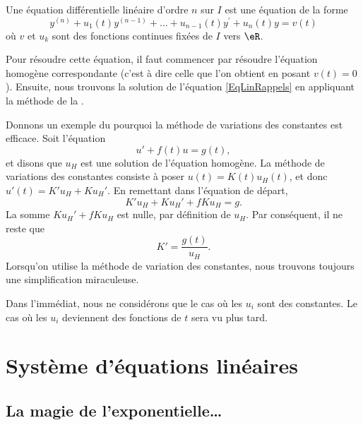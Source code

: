 Une équation différentielle linéaire d'ordre $n$ sur $I$ est une équation de la forme
\begin{equation}	\label{EqLinRappels}
	y^{(n)} + u_1(t) y^{(n-1)} + \ldots + u_{n-1}(t) y^\prime + u_n(t) y = v(t)
\end{equation}
où $v$ et $u_k$ sont des fonctions continues fixées de $I$ vers $\eR$.

Pour résoudre cette équation, il faut commencer par résoudre l'équation homogène correspondante (c'est à dire celle que l'on obtient en posant $v(t)=0$). Ensuite, nous trouvons la solution de l'équation \eqref{EqLinRappels} en appliquant la méthode de la .

Donnons un exemple du pourquoi la méthode de variations des constantes est efficace. Soit l'équation 
\begin{equation}		\label{EqDiffExempleVarCst}
	u'+f(t)u=g(t),
\end{equation}
 et disons que $u_H$ est une solution de l'équation homogène. La méthode de variations des constantes consiste à poser $u(t)=K(t)u_H(t)$, et donc $u'(t)=K'u_H+Ku_H'$. En remettant dans l'équation de départ,
\begin{equation}
	K'u_H+Ku_H'+fKu_H=g.
\end{equation}
La somme $Ku_H'+fKu_H$ est nulle, par définition de $u_H$. Par conséquent, il ne reste que
\begin{equation}
	K'=\frac{ g(t) }{ u_H }.
\end{equation}
Lorsqu'on utilise la méthode de variation des constantes, nous trouvons toujours une simplification \og miraculeuse\fg.

Dans l'immédiat, nous ne considérons que le cas où les \( u_i\) sont des constantes. Le cas où les \( u_i\) deviennent des fonctions de \( t\) sera vu plus tard.

\section{Système d'équations linéaires}

					\subsection{La magie de l'exponentielle\ldots}

